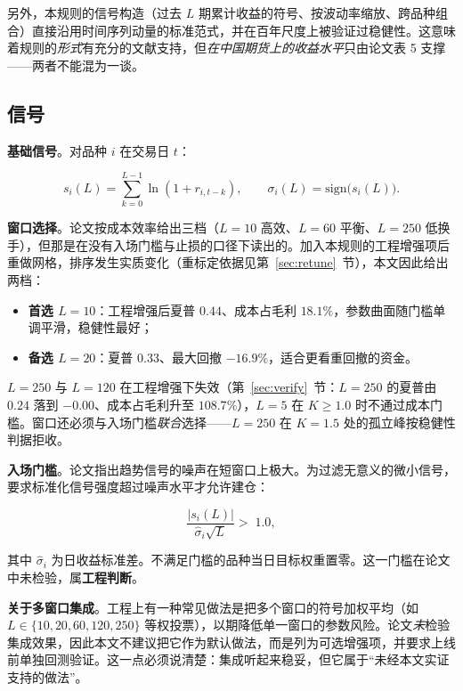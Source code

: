 另外，本规则的信号构造（过去 $L$ 期累计收益的符号、按波动率缩放、跨品种组合）直接沿用时间序列动量的标准范式\cite{mop2012}，并在百年尺度上被验证过稳健性\cite{hop2017}。这意味着规则的\emph{形式}有充分的文献支持，但\emph{在中国期货上的收益水平}只由论文表 5 支撑——两者不能混为一谈。

\subsection{信号}

\textbf{基础信号}。对品种 $i$ 在交易日 $t$：

\begin{equation}
s_i(L)=\sum_{k=0}^{L-1}\ln\left(1+r_{i,t-k}\right),\qquad
\sigma_i(L)=\mathrm{sign}\bigl(s_i(L)\bigr).
\end{equation}

\textbf{窗口选择}。论文按成本效率给出三档（$L=10$ 高效、$L=60$ 平衡、$L=250$ 低换手），但那是在没有入场门槛与止损的口径下读出的。加入本规则的工程增强项后重做网格，排序发生实质变化（重标定依据见第~\ref{sec:retune}~节），本文因此给出两档：

\begin{itemize}[leftmargin=2.2em]
  \item \textbf{首选 $L=10$}：工程增强后夏普 $0.44$、成本占毛利 $18.1\%$，参数曲面随门槛单调平滑，稳健性最好；
  \item \textbf{备选 $L=20$}：夏普 $0.33$、最大回撤 $-16.9\%$，适合更看重回撤的资金。
\end{itemize}

$L=250$ 与 $L=120$ 在工程增强下失效（第~\ref{sec:verify}~节：$L=250$ 的夏普由 $0.24$ 落到 $-0.00$、成本占毛利升至 $108.7\%$），$L=5$ 在 $K\ge1.0$ 时不通过成本门槛。窗口还必须与入场门槛\emph{联合}选择——$L=250$ 在 $K=1.5$ 处的孤立峰按稳健性判据拒收。

\textbf{入场门槛}。论文指出趋势信号的噪声在短窗口上极大。为过滤无意义的微小信号，要求标准化信号强度超过噪声水平才允许建仓：

\begin{equation}
\frac{\left|s_i(L)\right|}{\hat\sigma_i\sqrt{L}}>\;1.0 ,
\end{equation}

其中 $\hat\sigma_i$ 为日收益标准差。不满足门槛的品种当日目标权重置零。这一门槛在论文中未检验，属\textbf{工程判断}。

\textbf{关于多窗口集成}。工程上有一种常见做法是把多个窗口的符号加权平均（如 $L\in\{10,20,60,120,250\}$ 等权投票），以期降低单一窗口的参数风险。论文\emph{未}检验集成效果，因此本文不建议把它作为默认做法，而是列为可选增强项，并要求上线前单独回测验证。这一点必须说清楚：集成听起来稳妥，但它属于“未经本文实证支持的做法”。

